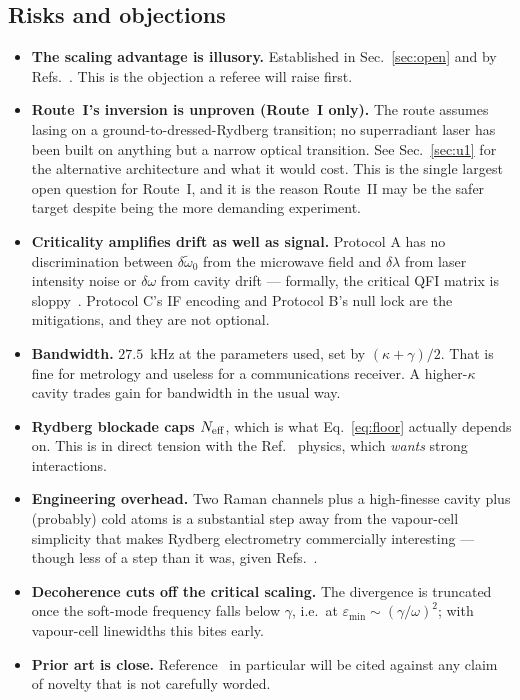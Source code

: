 \documentclass[11pt,a4paper]{article}
\newcommand{\wt}{\tilde{\omega}_{0}}
\begin{document}
\subsection{Risks and objections}

\begin{itemize}
  \item \textbf{The scaling advantage is illusory.} Established in Sec.~\ref{sec:open} and
        by Refs.~\cite{Rams2018,Gietka2021,Gyhm2025}. This is the objection a referee will
        raise first.
  \item \textbf{Route~I's inversion is unproven (Route~I only).} The route assumes lasing on a
        ground-to-dressed-Rydberg transition; no superradiant laser has been built on anything
        but a narrow optical transition. See Sec.~\ref{sec:u1} for the alternative
        architecture and what it would cost. This is the single largest open question for
        Route~I, and it is the reason Route~II may be the safer target despite being the more
        demanding experiment.
  \item \textbf{Criticality amplifies drift as well as signal.} Protocol A has no
        discrimination between $\delta\wt$ from the microwave field and $\delta\lambda$ from
        laser intensity noise or $\delta\omega$ from cavity drift --- formally, the critical
        QFI matrix is sloppy~\cite{MultiCrit2026}. Protocol C's IF encoding and Protocol B's
        null lock are the mitigations, and they are not optional.
  \item \textbf{Bandwidth.} $27.5$~kHz at the parameters used, set by $(\kappa+\gamma)/2$.
        That is fine for metrology and useless for a communications receiver. A higher-$\kappa$
        cavity trades gain for bandwidth in the usual way.
  \item \textbf{Rydberg blockade caps $N_{\rm eff}$}, which is what Eq.~\eqref{eq:floor}
        actually depends on. This is in direct tension with the Ref.~\cite{Zhang2013} physics,
        which \emph{wants} strong interactions.
  \item \textbf{Engineering overhead.} Two Raman channels plus a high-finesse cavity plus
        (probably) cold atoms is a substantial step away from the vapour-cell simplicity that
        makes Rydberg electrometry commercially interesting --- though less of a step than it
        was, given Refs.~\cite{Anisotropic2025,CavitySuperhet2025}.
  \item \textbf{Decoherence cuts off the critical scaling.} The divergence is truncated once
        the soft-mode frequency falls below $\gamma$, i.e.\ at
        $\varepsilon_{\min}\sim(\gamma/\omega)^2$; with vapour-cell linewidths this bites
        early.
  \item \textbf{Prior art is close.} Reference~\cite{Wang2025} in particular will be cited
        against any claim of novelty that is not carefully worded.
\end{itemize}
\end{document}
